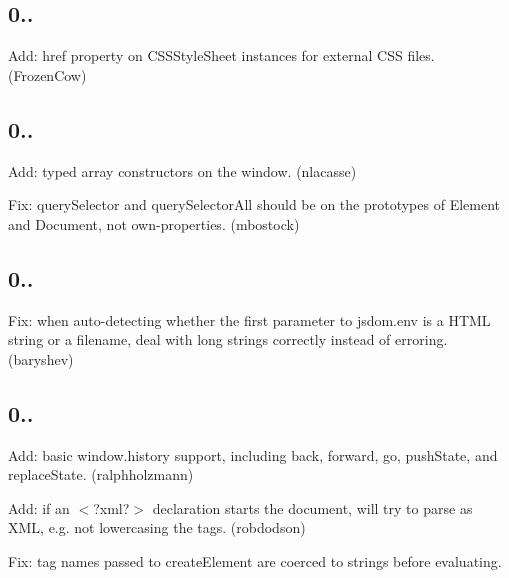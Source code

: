 \subsection*{0..}


\begin{DoxyItemize}
\item Add\+: {\ttfamily href} property on {\ttfamily C\+S\+S\+Style\+Sheet} instances for external C\+SS files. (Frozen\+Cow)
\end{DoxyItemize}

\subsection*{0..}


\begin{DoxyItemize}
\item Add\+: typed array constructors on the {\ttfamily window}. (nlacasse)
\item Fix\+: {\ttfamily query\+Selector} and {\ttfamily query\+Selector\+All} should be on the prototypes of {\ttfamily Element} and {\ttfamily Document}, not own-\/properties. (mbostock)
\end{DoxyItemize}

\subsection*{0..}


\begin{DoxyItemize}
\item Fix\+: when auto-\/detecting whether the first parameter to {\ttfamily jsdom.\+env} is a H\+T\+ML string or a filename, deal with long strings correctly instead of erroring. (baryshev)
\end{DoxyItemize}

\subsection*{0..}


\begin{DoxyItemize}
\item Add\+: basic {\ttfamily window.\+history} support, including {\ttfamily back}, {\ttfamily forward}, {\ttfamily go}, {\ttfamily push\+State}, and {\ttfamily replace\+State}. (ralphholzmann)
\item Add\+: if an {\ttfamily $<$?xml?$>$} declaration starts the document, will try to parse as X\+ML, e.\+g. not lowercasing the tags. (robdodson)
\item Fix\+: tag names passed to {\ttfamily create\+Element} are coerced to strings before evaluating.
\end{DoxyItemize}

